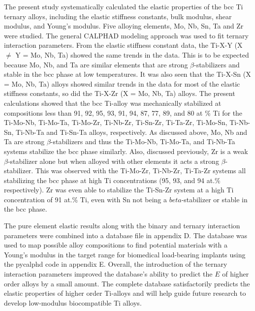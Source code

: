 The present study systematically calculated the elastic properties of the bcc Ti ternary alloys, including the elastic stiffness constants, bulk modulus, shear modulus, and Young's modulus. Five alloying elements, Mo, Nb, Sn, Ta and Zr were studied. The general CALPHAD modeling approach was used to fit ternary interaction parameters. From the elastic stiffness constant data, the Ti-X-Y (X $\neq$ Y = Mo, Nb, Ta) showed the same trends in the data. This is to be expected because Mo, Nb, and Ta are similar elements that are strong $\beta$-stabilizers and stable in the bcc phase at low temperatures. It was also seen that the Ti-X-Sn (X = Mo, Nb, Ta) alloys showed similar trends in the data for most of the elastic stiffness constants, so did the Ti-X-Zr (X = Mo, Nb, Ta) alloys. The present calculations showed that the bcc Ti-alloy was mechanically stabilized at compositions less than 91, 92, 95, 93, 91, 94, 87, 77, 89, and 80 at \% Ti for the Ti-Mo-Nb, Ti-Mo-Ta, Ti-Mo-Zr, Ti-Nb-Zr, Ti-Sn-Zr, Ti-Ta-Zr, Ti-Mo-Sn, Ti-Nb-Sn, Ti-Nb-Ta and Ti-Sn-Ta alloys, respectively. As discussed above, Mo, Nb and Ta are strong $\beta$-stabilizers and thus the Ti-Mo-Nb, Ti-Mo-Ta, and Ti-Nb-Ta systems stabilize the bcc phase similarly. Also, discussed previously, Zr is a weak $\beta$-stabilizer alone but when alloyed with other elements it acts a strong $\beta$-stabilizer. This was observed with the Ti-Mo-Zr, Ti-Nb-Zr, Ti-Ta-Zr systems all stabilizing the bcc phase at high Ti concentrations (95, 93, and 94 at.\% respectively). Zr was even able to stabilize the Ti-Sn-Zr system at a high Ti concentration of 91 at.\% Ti, even with Sn not being a $beta$-stabilizer or stable in the bcc phase. 

The pure element elastic results along with the binary and ternary interaction parameters were combined into a database file in appendix D. The database was used to map possible alloy compositions to find potential materials with a Young's modulus in the target range for biomedical load-bearing implants using the pycalphd code in appendix E. Overall, the introduction of the ternary interaction parameters improved the database's ability to predict the $E$ of higher order alloys by a small amount. The complete database satisfactorily predicts the elastic properties of higher order Ti-alloys and will help guide future research to develop low-modulus biocompatible Ti alloys.


